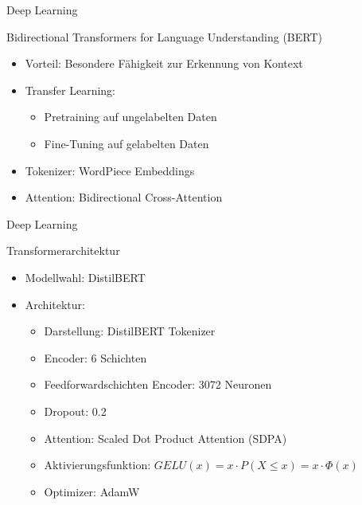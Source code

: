 \documentclass[aspectratio=169]{beamer} %
\begin{document}
\begin{frame}{Deep Learning}
\begin{block}{Bidirectional Transformers for Language Understanding (BERT)}
\begin{itemize}
\item Vorteil: Besondere Fähigkeit zur Erkennung von Kontext
\item Transfer Learning:
\begin{itemize}
\item Pretraining auf ungelabelten Daten
\item Fine-Tuning auf gelabelten Daten
\end{itemize}
\item Tokenizer: WordPiece Embeddings 
\item Attention: Bidirectional Cross-Attention
\end{itemize}
\end{block}
\end{frame}


\begin{frame}{Deep Learning}
    \begin{block}{Transformerarchitektur}
        \begin{itemize}
        \item Modellwahl: DistilBERT \\
         
       \item  Architektur:
        \begin{itemize}
            \item Darstellung: DistilBERT Tokenizer %
            \item Encoder: 6 Schichten 
            \item Feedforwardschichten Encoder: 3072 Neuronen
            \item Dropout: 0.2
            \item Attention: Scaled Dot Product Attention (SDPA)
            \item Aktivierungsfunktion: $GELU(x) = x \cdot P(X \leq x) = x \cdot \Phi(x) $
            \item Optimizer: AdamW
        \end{itemize}
        \end{itemize}
    \end{block}
\end{frame}
\end{document}
